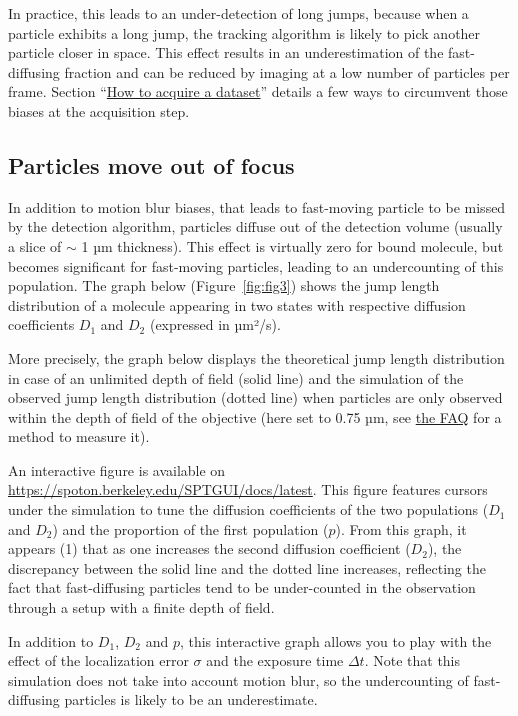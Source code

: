 In practice, this leads to an under-detection of long jumps, because when a particle exhibits a long jump, the tracking algorithm is likely to pick another particle closer in space. This effect results in an underestimation of the fast-diffusing fraction and can be reduced by imaging at a low number of particles per frame. Section ``\href{https://spoton.berkeley.edu/SPTGUI/docs/latest#how-to-acquire-a-good-dataset-}{How to acquire a dataset}'' details a few ways to circumvent those biases at the acquisition step.

\subsection{Particles move out of focus}

In addition to motion blur biases, that leads to fast-moving particle to be missed by the detection algorithm, particles diffuse out of the detection volume (usually a slice of \(\sim\) 1  µm thickness). This effect is virtually zero for bound molecule, but becomes significant for fast-moving particles, leading to an undercounting of this population. The graph below (Figure~\ref{fig:fig3}) shows the jump length distribution of a molecule appearing in two states with respective diffusion coefficients \(D_1\) and \(D_2\) (expressed in µm²/s).

More precisely, the graph below displays the theoretical jump length distribution in case of an unlimited depth of field (solid line) and the simulation of the observed jump length distribution (dotted line) when particles are only observed within the depth of field of the objective (here set to 0.75 µm, see \href{https://spoton.berkeley.edu/SPTGUI/docs/latest#measure-locerror}{the FAQ} for a method to measure it).

An interactive figure is available on \url{https://spoton.berkeley.edu/SPTGUI/docs/latest}. This figure features cursors under the simulation to tune the diffusion coefficients of the two populations (\(D_1\) and \(D_2\)) and the proportion of the first population (\(p\)). From this graph, it appears (1) that as one increases the second diffusion coefficient (\(D_2\)), the discrepancy between the solid line and the dotted line increases, reflecting the fact that fast-diffusing particles tend to be under-counted in the observation through a setup with a finite depth of field.

In addition to \(D_1\), \(D_2\) and \(p\), this interactive graph allows you to play with the effect of the localization error \(\sigma\) and the exposure time \(\Delta t\). Note that this simulation does not take into account motion blur, so the undercounting of fast-diffusing particles is likely to be an underestimate.

